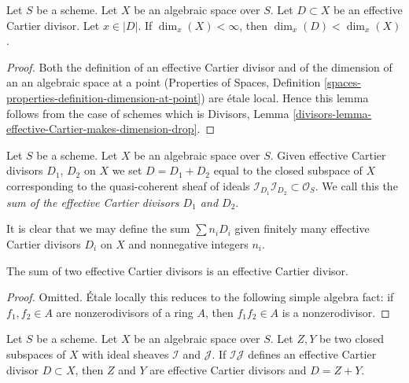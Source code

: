\begin{lemma}
\label{lemma-effective-Cartier-makes-dimension-drop}
Let $S$ be a scheme. Let $X$ be an algebraic space over $S$.
Let $D \subset X$ be an effective Cartier divisor.
Let $x \in |D|$.
If $\dim_x(X) < \infty$, then $\dim_x(D) < \dim_x(X)$.
\end{lemma}

\begin{proof}
Both the definition of an effective Cartier divisor and of the
dimension of an an algebraic space at a point
(Properties of Spaces, Definition
\ref{spaces-properties-definition-dimension-at-point})
are \'etale local. Hence this lemma follows from the case of schemes
which is
Divisors, Lemma \ref{divisors-lemma-effective-Cartier-makes-dimension-drop}.
\end{proof}

\begin{definition}
\label{definition-sum-effective-Cartier-divisors}
Let $S$ be a scheme. Let $X$ be an algebraic space over $S$.
Given effective Cartier divisors
$D_1$, $D_2$ on $X$ we set $D = D_1 + D_2$ equal to the
closed subspace of $X$ corresponding to the quasi-coherent
sheaf of ideals
$\mathcal{I}_{D_1}\mathcal{I}_{D_2} \subset \mathcal{O}_S$.
We call this the {\it sum of the effective Cartier divisors
$D_1$ and $D_2$}.
\end{definition}

\noindent
It is clear that we may define the sum $\sum n_iD_i$ given
finitely many effective Cartier divisors $D_i$ on $X$
and nonnegative integers $n_i$.

\begin{lemma}
\label{lemma-sum-effective-Cartier-divisors}
The sum of two effective Cartier divisors is an effective
Cartier divisor.
\end{lemma}

\begin{proof}
Omitted. \'Etale locally this reduces to the following simple
algebra fact: if $f_1, f_2 \in A$ are nonzerodivisors of a ring $A$, then
$f_1f_2 \in A$ is a nonzerodivisor.
\end{proof}

\begin{lemma}
\label{lemma-sum-closed-subschemes-effective-Cartier}
Let $S$ be a scheme. Let $X$ be an algebraic space over $S$.
Let $Z, Y$ be two closed subspaces of $X$
with ideal sheaves $\mathcal{I}$ and $\mathcal{J}$. If $\mathcal{I}\mathcal{J}$
defines an effective Cartier divisor $D \subset X$, then $Z$ and $Y$
are effective Cartier divisors and $D = Z + Y$.
\end{lemma}


